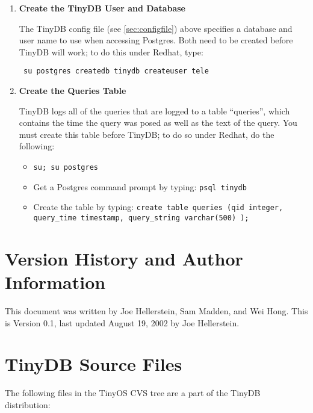 \documentclass[11pt]{article}
\newcommand{\java}{broken/dev/tools/java}
\begin{document}
\begin{enumerate}
{\tt export CLASSPATH=\$CLASSPATH:\java/jars/pgjdbc2.jar}

\item{\bf Create the TinyDB User and Database}

The TinyDB config file (see \ref{sec:configfile}) above specifies a database and user name to use when accessing 
Postgres.  Both need to be created before TinyDB will work;  to do this under Redhat, type:

{\tt
su
postgres
createdb tinydb
createuser tele
}

\item{\bf Create the Queries Table}

TinyDB logs all of the queries that are logged to a table ``queries'', which contains the time
the query was posed as well as the text of the query.  You must create this table before TinyDB;
to do so under Redhat, do the following:

\begin{itemize}
\item {\tt su; su postgres}
\item Get a Postgres command prompt by typing: {\tt psql tinydb}
\item Create the table by typing: {\tt create table queries (qid integer, query\_time timestamp, query\_string varchar(500)	 );}
\end{itemize}
\end{enumerate}


\section{Version History and Author Information}

This document was written by Joe Hellerstein, Sam Madden, and Wei Hong.  This
is Version 0.1, last updated August 19, 2002 by Joe Hellerstein.


\appendix

\section{TinyDB Source Files}
\label{app:files}
The following files in the TinyOS CVS tree are a
part of the TinyDB distribution:
\end{document}
